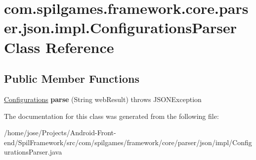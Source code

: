 \hypertarget{classcom_1_1spilgames_1_1framework_1_1core_1_1parser_1_1json_1_1impl_1_1_configurations_parser}{\section{com.\-spilgames.\-framework.\-core.\-parser.\-json.\-impl.\-Configurations\-Parser Class Reference}
\label{classcom_1_1spilgames_1_1framework_1_1core_1_1parser_1_1json_1_1impl_1_1_configurations_parser}
}
\subsection*{Public Member Functions}
\begin{DoxyCompactItemize}
\item 
\hypertarget{classcom_1_1spilgames_1_1framework_1_1core_1_1parser_1_1json_1_1impl_1_1_configurations_parser_a99c1b7011ca654e712a7cb0d9381c251}{\hyperlink{classcom_1_1spilgames_1_1framework_1_1data_1_1_configurations}{Configurations} {\bfseries parse} (String web\-Result)  throws J\-S\-O\-N\-Exception }\label{classcom_1_1spilgames_1_1framework_1_1core_1_1parser_1_1json_1_1impl_1_1_configurations_parser_a99c1b7011ca654e712a7cb0d9381c251}

\end{DoxyCompactItemize}


The documentation for this class was generated from the following file\-:\begin{DoxyCompactItemize}
\item 
/home/jose/\-Projects/\-Android-\/\-Front-\/end/\-Spil\-Framework/src/com/spilgames/framework/core/parser/json/impl/Configurations\-Parser.\-java\end{DoxyCompactItemize}
